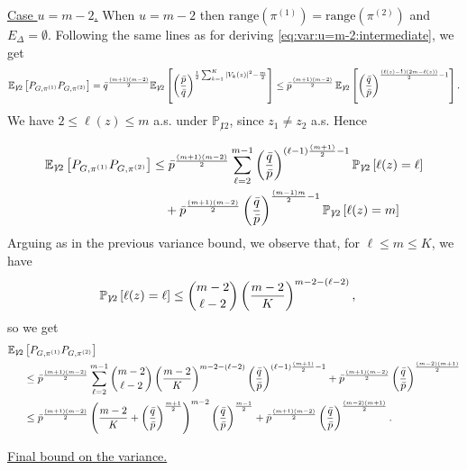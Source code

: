 \documentclass[final]{colt2026}
\newcommand{\1}{\mathbf{1}}
\newcommand{\bbE}{\mathbb{E}}
\newcommand{\bbP}{\mathbb{P}}
\newcommand{\pa}[1]{\left(#1\right)}
\newcommand{\cro}[1]{\left[#1\right]}
\begin{document}
\noindent\underline{Case $u= m-2$.} When $u=m-2$ then $\text{range}(\pi^{(1)})= \text{range}(\pi^{(2)})$
and $E_{\Delta}=\emptyset$. Following the same lines as for deriving \eqref{eq:var:u=m-2:intermediate}, we get
$$\bbE_{\not 12}\cro{P_{G,\pi^{(1)}}P_{G,\pi^{(2)}}} 
=   \bar q^{(m+1)(m-2)\over 2} \bbE_{\not 12}\cro{\pa{\bar p\over \bar q}^{{1\over 2}\sum_{k=1}^K |V_{k}(z)|^2-{m\over 2}}}
 \leq   \bar p^{(m+1)(m-2)\over 2} \,  \bbE_{\not 12}\cro{\pa{\bar q\over \bar p}^{{(\ell(z)-1)(2m-\ell(z))\over 2}{-1}}}.$$
We have $2\leq \ell(z)\leq m$ a.s. under $\bbP_{\not 12}$, since $z_{1}\neq z_{2}$ a.s.
Hence

\begin{align*}
\bbE_{\not 12}\cro{P_{G,\pi^{(1)}}P_{G,\pi^{(2)}}}
& \leq   \bar p^{(m+1)(m-2)\over 2} \sum_{\ell=2}^{m-1}\pa{\bar q\over \bar p}^{(\ell-1){(m+1)\over 2}{-1}}\bbP_{\not 12}\cro{\ell(z)=\ell}\\
&\quad + \bar p^{(m+1)(m-2)\over 2}\pa{\bar q\over \bar p}^{{(m-1)m\over 2}{-1}}\bbP_{\not 12}\cro{\ell(z)=m}
\end{align*}
Arguing as in the previous variance bound, we observe that, for $\ell\leq m\leq K$, we have 
\begin{align*}
\bbP_{\not 12}\cro{\ell(z)=\ell}&  \leq  \binom{m-2}{\ell-2}\pa{m-2 \over K}^{m-2-(\ell-2)},
\end{align*}
so  we get
\begin{align*}
\bbE_{\not 12}&\cro{P_{G,\pi^{(1)}}P_{G,\pi^{(2)}}}\\
&\leq   \bar p^{(m+1)(m-2)\over 2} \sum_{\ell=2}^{m-1} \binom{m-2}{\ell-2}\pa{m-2 \over K}^{m-2-(\ell-2)} \pa{\bar q\over \bar p}^{(\ell-1){(m+1)\over 2}{-1}}+ \bar p^{(m+1)(m-2)\over 2}\pa{\bar q\over \bar p}^{{(m-2)(m+1)\over 2}}\\
&\leq  \bar p^{(m+1)(m-2)\over 2} \pa{{m-2 \over K}+\pa{\bar q\over \bar p}^{{m+1\over 2}}}^{m-2}\pa{\bar q\over \bar p}^{{m-1\over 2}}+ \bar p^{(m+1)(m-2)\over 2}\pa{\bar q\over \bar p}^{{(m-2)(m+1)\over 2}}.
\end{align*}


\noindent\underline{Final bound on the variance.}
\end{document}
